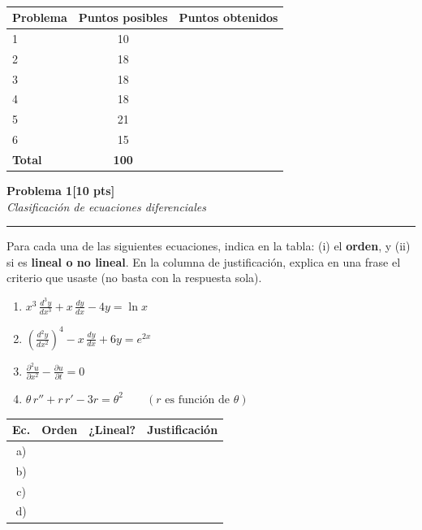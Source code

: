 \documentclass[11pt,letterpaper]{article}
\newcommand{\problema}[3]{%
  \bigskip\bigskip\noindent
  {\Large\textbf{Problema #1}}\hfill\textbf{[#2 pts]}\\[3pt]
  {\small\itshape #3}\par
  \vspace{2pt}\hrule\vspace{8pt}
}
\renewcommand{\arraystretch}{1.3}
\begin{document}
\vspace{8pt}

\\[4pt]
\begin{tabular}{lcc}
\toprule
Problema & Puntos posibles & Puntos obtenidos \\
\midrule
1 & 10 & \\
2 & 18 & \\
3 & 18 & \\
4 & 18 & \\
5 & 21 & \\
6 & 15 & \\
\midrule
\textbf{Total} & \textbf{100} & \\
\bottomrule
\end{tabular}


\problema{1}{10}{Clasificación de ecuaciones diferenciales}

Para cada una de las siguientes ecuaciones, indica en la tabla: (i) el \textbf{orden}, y (ii) si es \textbf{lineal o no lineal}. En la columna de justificación, explica en una frase el criterio que usaste (no basta con la respuesta sola).

\begin{enumerate}[label=\textbf{\alph*)}, leftmargin=2em, itemsep=10pt]
  \item $\displaystyle x^3\,\frac{d^3y}{dx^3} + x\,\frac{dy}{dx} - 4y = \ln x$
  \item $\displaystyle \left(\frac{d^2y}{dx^2}\right)^{4} - x\,\frac{dy}{dx} + 6y = e^{2x}$
  \item $\displaystyle \frac{\partial^2 u}{\partial x^2} - \frac{\partial u}{\partial t} = 0$
  \item $\displaystyle \theta\, r'' + r\,r' - 3r = \theta^2 \qquad (r \text{ es función de } \theta)$
\end{enumerate}

\renewcommand{\arraystretch}{2.6}
\noindent\begin{tabular}{|c|>{\centering\arraybackslash}p{1.6cm}|>{\centering\arraybackslash}p{2cm}|>{\arraybackslash}p{7.9cm}|}
\hline
\textbf{Ec.} & \textbf{Orden} & \textbf{¿Lineal?} & \textbf{Justificación} \\
\hline
a) & & & \\
\hline
b) & & & \\
\hline
c) & & & \\
\hline
d) & & & \\
\hline
\end{tabular}
\renewcommand{\arraystretch}{1.3}
\end{document}
